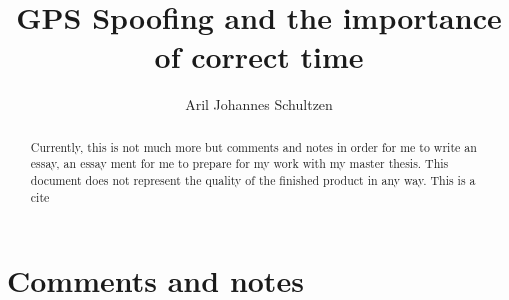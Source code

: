 \documentclass[a4paper,10pt]{article}
\title{GPS Spoofing and the importance of correct time}
\author{Aril Johannes Schultzen}
\begin{document}
\maketitle

\begin{abstract}
Currently, this is not much more but comments and notes in order for me to write an essay, an essay ment for me to prepare for my work with my master thesis. This document does not represent the quality of the finished product in any way. This is a cite \cite{KandR}
\end{abstract}

\section{Comments and notes}

\newpage
 
\printbibliography[title={Complete Bibliography}]
\end{document}
